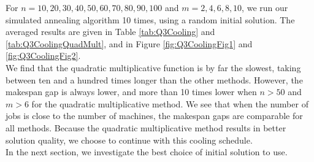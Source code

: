\documentclass[12pt,a4paper,reqno]{article}
\begin{document}
For $n=10,20,30,40,50,60,70,80,90,100$ and $m=2,4,6,8,10$, we run our simulated annealing algorithm 10 times, using a random initial solution. The averaged results are given in Table \ref{tab:Q3Cooling} and \ref{tab:Q3CoolingQuadMult}, and in Figure \ref{fig:Q3CoolingFig1} and \ref{fig:Q3CoolingFig2}. \\

We find that the quadratic multiplicative function is by far the slowest, taking between ten and a hundred times longer than the other methods. However, the makespan gap is always lower, and more than 10 times lower when $n>50$ and $m>6$ for the quadratic multiplicative method. We see that when the number of jobs is close to the number of machines, the makespan gaps are comparable for all methods. Because the quadratic multiplicative method results in better solution quality, we choose to continue with this cooling schedule. \\

In the next section, we investigate the best choice of initial solution to use.
\end{document}
